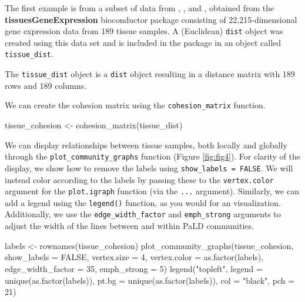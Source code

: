 The first example is from a subset of data from \citet{zilliox2007gene},
\citet{mccall2011gene}, and \citet{mccall2014gene}, obtained from the
\textbf{tissuesGeneExpression} bioconductor package \citep{tissue}
consisting of 22,215-dimensional gene expression data from 189 tissue
samples. A (Euclidean) \texttt{dist} object was created using this data
set and is included in the  package in an object called
\texttt{tissue\_dist}.

The \texttt{tissue\_dist} object is a \texttt{dist} object resulting in
a distance matrix with 189 rows and 189 columns.

We can create the cohesion matrix using the \texttt{cohesion\_matrix}
function.

\begin{Schunk}
\begin{Sinput}
tissue_cohesion <- cohesion_matrix(tissue_dist)
\end{Sinput}
\end{Schunk}

We can display relationships between tissue samples, both locally and
globally through the \texttt{plot\_community\_graphs} function (Figure
\ref{fig:fig4}). For clarity of the display, we show how to remove the
labels using \texttt{show\_labels\ =\ FALSE}. We will instead color
according to the labels by passing these to the \texttt{vertex.color}
argument for the \texttt{plot.igraph} function (via the \texttt{...}
argument). Similarly, we can add a legend using the \texttt{legend()}
function, as you would for an  visualization.
Additionally, we use the \texttt{edge\_width\_factor} and
\texttt{emph\_strong} arguments to adjust the width of the lines between
and within PaLD communities.

\begin{Schunk}
\begin{Sinput}
labels <- rownames(tissue_cohesion)
plot_community_graphs(tissue_cohesion,
                      show_labels = FALSE,
                      vertex.size = 4,
                      vertex.color = as.factor(labels),
                      edge_width_factor = 35,
                      emph_strong = 5)
legend("topleft",
       legend = unique(as.factor(labels)),
       pt.bg = unique(as.factor(labels)),
       col = "black",
       pch = 21)
\end{Sinput}
\end{Schunk}

